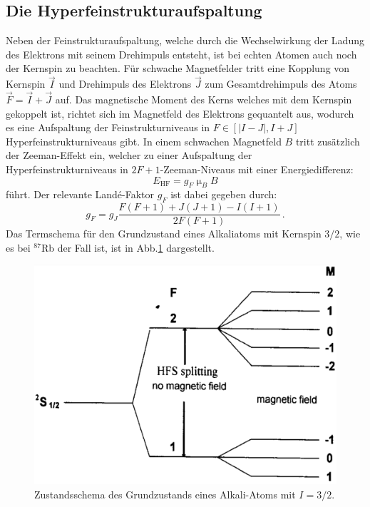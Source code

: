 \subsection{Die Hyperfeinstrukturaufspaltung}
Neben der Feinstrukturaufspaltung, welche durch die Wechselwirkung der Ladung des Elektrons mit seinem Drehimpuls entsteht, ist bei echten Atomen auch noch der Kernspin zu beachten. Für schwache Magnetfelder tritt eine Kopplung von Kernspin $\vec{I}$ und Drehimpuls des Elektrons $\vec{J}$ zum Gesamtdrehimpuls des Atoms $\vec{F}=\vec{I}+\vec{J}$ auf. Das magnetische Moment des Kerns welches mit dem Kernspin gekoppelt ist, richtet sich im Magnetfeld des Elektrons gequantelt aus, wodurch es
eine Aufspaltung der Feinstrukturniveaus in $F \in [|I-J|,I+J]$ Hyperfeinstrukturniveaus gibt.
In einem schwachen Magnetfeld $B$ tritt zusätzlich der Zeeman-Effekt ein, welcher zu einer Aufspaltung der Hyperfeinstrukturniveaus in $2F+1$-Zeeman-Niveaus mit einer Energiedifferenz:
\begin{equation}
  E_{\text{HF}}=g_F\upmu_BB
\end{equation}
führt. Der relevante Landé-Faktor $g_F$ ist dabei gegeben durch:
\begin{equation}
  g_F=g_J\frac{F(F+1)+J(J+1)-I(I+1)}{2F(F+1)}\,.
  \label{eq:gf}
\end{equation}
Das Termschema für den Grundzustand eines Alkaliatoms mit Kernspin $3/2$, wie es bei $^{87}$Rb der Fall ist, ist in Abb.\ref{Hyperfein} dargestellt.
\begin{figure}
  \centering
  \includegraphics[scale=0.4]{Bilder/Hyperfein}
  \caption{Zustandsschema des Grundzustands eines Alkali-Atoms mit $I=3/2$\cite{Black}.}
  \label{Hyperfein}
\end{figure}
